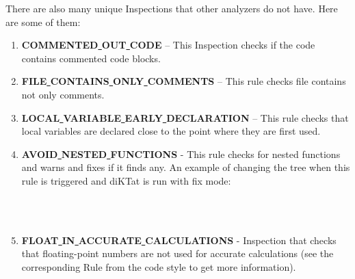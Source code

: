 There are also many unique Inspections that other analyzers do not have. Here are some of them:

\begin{enumerate}
    \item \textbf{COMMENTED\underline{ }OUT\underline{ }CODE} – This Inspection checks if the code contains commented code blocks.
    \item \textbf{FILE\underline{ }CONTAINS\underline{ }ONLY\underline{ }COMMENTS} – This rule checks file contains not only comments.
    \item \textbf{LOCAL\underline{ }VARIABLE\underline{ }EARLY\underline{ }DECLARATION} – This rule checks that local variables are declared close to the point where they are first used.
    \item \textbf{AVOID\underline{ }NESTED\underline{ }FUNCTIONS} - This rule checks for nested functions and warns and fixes if it finds any. An example of changing the tree when this rule is triggered and diKTat is run with fix mode:\\\\
\\
    \item \textbf{FLOAT\underline{ }IN\underline{ }ACCURATE\underline{ }CALCULATIONS} - Inspection that checks that floating-point numbers are not used for accurate calculations (see the corresponding Rule from the code style to get more information).


\end{enumerate}
